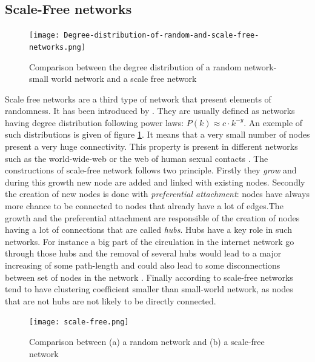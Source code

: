 \documentclass[a4paper, 12pt]{report}
\begin{document}
\subsection{Scale-Free networks}
\begin{figure}
\centering
\texttt{[image: Degree-distribution-of-random-and-scale-free-networks.png]}
\caption{Comparison between the degree distribution of a random network- small world network and a scale free network \citep{scale-free_degree}}
\label{scale-free_degree}
\end{figure}

Scale free networks are a third type of network that present elements of randomness. It has been introduced by \cite{scale-free}. They are usually defined as networks having degree distribution following power laws: $ P(k) \approx c \cdot k^{-y}$. An exemple of such distributions is given of figure \ref{scale-free_degree}. It means that a very small number of nodes present a very huge connectivity.  This property is present in different networks such as the world-wide-web \citep{www} or the web of human sexual contacts \citep{sexual}. The constructions of scale-free network follows two principle. Firstly they \textit{grow} and during this growth new node are added and linked with existing nodes. Secondly the creation of new nodes is done with \textit{preferential  attachment}: nodes have always more chance to be connected to nodes that already have a lot of edges.The growth and the preferential attachment are responsible of the creation of nodes having a lot of connections that are called \textit{hubs}. Hubs have a key role in such networks. For instance a big part of the circulation in the internet network go through those hubs and the removal of several hubs would lead to a major increasing of some path-length and could also lead to some disconnections between set of nodes in the network \citep{general_scale-free}. Finally according to \cite{SMVSSF} scale-free networks tend to have clustering coefficient smaller than small-world network, as nodes that are not hubs are not likely to be directly connected. \citep{general_scale_free2}\\

\begin{figure}
\centering
\texttt{[image: scale-free.png]}
\caption{Comparison between (a) a random network and (b) a scale-free network \citep{complex_networks}}
\label{scale-free_pictures}
\end{figure}
\end{document}

